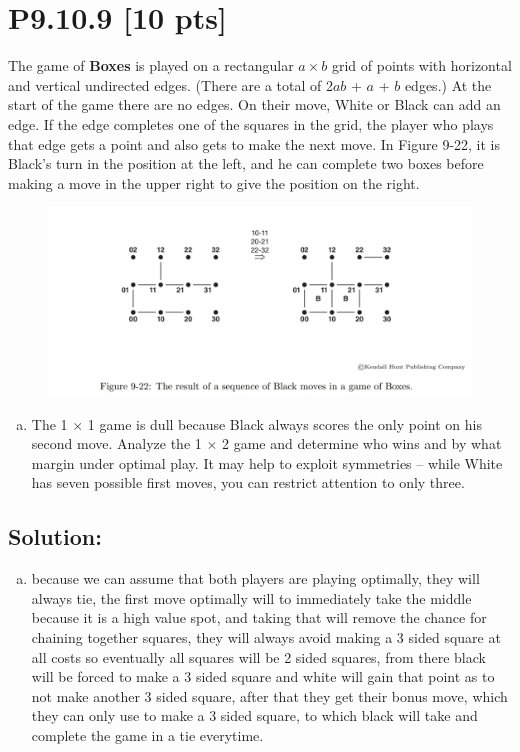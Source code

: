 \documentclass[12pt]{article}
\begin{document}
\section*{\textbf{P9.10.9} [10 pts]}
The game of \textbf{Boxes} is played on a rectangular $a \times b$ grid of points with horizontal and vertical undirected edges. (There are a total of 2$ab$ + $a$ + $b$ edges.) At the start of the game there are no edges. On their move, White or Black can add an edge. If the edge completes one of the squares in the grid, the player who plays that edge gets a point and also gets to make the next move. In Figure 9-22, it is Black’s turn in the position at the left, and he can complete two boxes before making a move in the upper right to give the position on the right.
\begin{figure}[h]
    \centering
    \includegraphics[width=1\linewidth]{9-22.png}
\end{figure}

\begin{enumerate}[(c)]
    \item  The 1 $\times$ 1 game is dull because Black always scores the only point on his second move. Analyze the 1 $\times$ 2 game and determine who wins and by what margin under optimal play. It may help to exploit symmetries – while White has seven possible first moves, you can restrict attention to only three.

\end{enumerate}
\subsection*{\textbf{Solution:}}
\begin{enumerate}[(c)]
    \item 
    because we can assume that both players are playing optimally, they will always tie, the first move optimally will to immediately take the middle because it is a high value spot, and taking that will remove the chance for chaining together squares, they will always avoid making a 3 sided square at all costs so eventually all squares will be 2 sided squares, from there black will be forced to make a 3 sided square and white will gain that point as to not make another 3 sided square, after that they get their bonus move, which they can only use to make a 3 sided square, to which black will take and complete the game in a tie everytime.
\end{enumerate}
\end{document}
